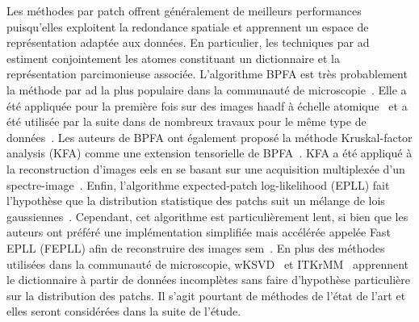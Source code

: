 Les méthodes par patch offrent généralement de meilleurs performances puisqu'elles exploitent la redondance spatiale et apprennent un espace de représentation adaptée aux données. En particulier, les techniques par \gls{ad} estiment conjointement les atomes constituant un dictionnaire et la représentation parcimonieuse associée. %
%
L'algorithme BPFA est très probablement la méthode par \gls{ad} la plus populaire dans la communauté de microscopie~\cite{xing2012siam}. Elle a été appliquée pour la première fois sur des images \gls{haadf} à échelle atomique~\cite{stevens2014potential} et a été utilisée par la suite dans de nombreux travaux pour le même type de données~\cite{mucke2016practical,kovarik2016implementation}.
%
Les auteurs de BPFA ont également proposé la méthode Kruskal-factor analysis (KFA) comme une extension tensorielle de BPFA~\cite{stevens2017tensor}. KFA a été appliqué à la reconstruction d'images \gls{eels} en se basant sur une acquisition multiplexée d'un spectre-image~\cite{stevens2016mm}.
%
Enfin, l'algorithme expected-patch log-likelihood (EPLL) fait l'hypothèse que la distribution statistique des patchs suit un mélange de lois gaussiennes~\cite{zoran2011from}. Cependant, cet algorithme est particulièrement lent, si bien que les auteurs ont préféré une implémentation simplifiée mais accélérée appelée Fast EPLL (FEPLL) afin de reconstruire des images \gls{sem}~\cite{parameswaran2019accelerating}.
%
En plus des méthodes utilisées dans la communauté de microscopie, wKSVD~\cite{mairal2008tip} et ITKrMM~\cite{naumova2018fast,naumova2017dictionary} apprennent le dictionnaire à partir de données incomplètes sans faire d'hypothèse particulière sur la distribution des patchs. Il s'agit pourtant de méthodes de l'état de l'art et elles seront considérées dans la suite de l'étude.

